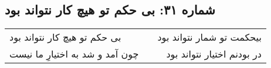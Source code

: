 \begin{center}
\section*{شماره ۳۱: بی حکم تو هیچ کار نتواند بود}
\label{sec:031}
\begin{longtable}{l p{0.5cm} r}
بی حکم تو هیچ کار نتواند بود
&&
بیحکمت تو شمار نتواند بود
\\
چون آمد و شد به اختیارِ ما نیست
&&
در بودنم اختیار نتواند بود
\\
\end{longtable}
\end{center}
